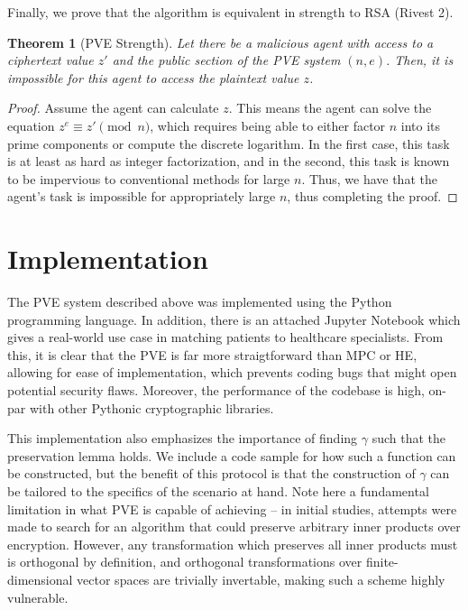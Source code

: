 \documentclass{article}
\newtheorem{theorem}{Theorem}[section]
\begin{document}
\begin{multicols}{2}
Finally, we prove that the algorithm is equivalent in strength to RSA (Rivest 2).

\begin{theorem}[PVE Strength]
    Let there be a malicious agent with access to a ciphertext value $z'$ and the public section of the PVE system $(n,e)$. Then, it is impossible for this agent to access the plaintext value $z$.
\end{theorem}
\begin{proof}
    Assume the agent can calculate $z$. This means the agent can solve the equation $z^e \equiv z' \pmod{n}$, which requires being able to either factor $n$ into its prime components or compute the discrete logarithm. In the first case, this task is at least as hard as integer factorization, and in the second, this task is known to be impervious to conventional methods for large $n$. Thus, we have that the agent's task is impossible for appropriately large $n$, thus completing the proof.
\end{proof}

\section{Implementation}

The PVE system described above was implemented using the Python programming language. In addition, there is an attached Jupyter Notebook which gives a real-world use case in matching patients to healthcare specialists. From this, it is clear that the PVE is far more straigtforward than MPC or HE, allowing for ease of implementation, which prevents coding bugs that might open potential security flaws. Moreover, the performance of the codebase is high, on-par with other Pythonic cryptographic libraries.

This implementation also emphasizes the importance of finding $\gamma$ such that the preservation lemma holds. We include a code sample for how such a function can be constructed, but the benefit of this protocol is that the construction of $\gamma$ can be tailored to the specifics of the scenario at hand. Note here a fundamental limitation in what PVE is capable of achieving – in initial studies, attempts were made to search for an algorithm that could preserve arbitrary inner products over encryption. However, any transformation which preserves all inner products must is orthogonal by definition, and orthogonal transformations over finite-dimensional vector spaces are trivially invertable, making such a scheme highly vulnerable.


\end{multicols}
\end{document}
